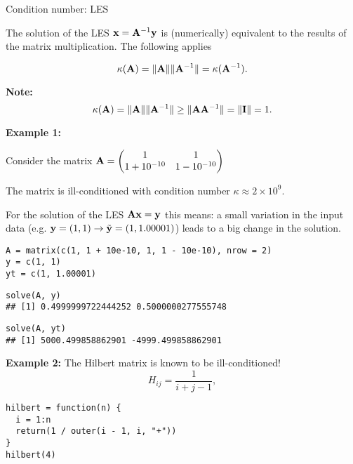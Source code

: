 \documentclass[11pt,compress,t,notes=noshow, xcolor=table]{beamer}
\begin{document}
\begin{vbframe}{Condition number: LES}

The solution of the LES $\mathbf{x} = \mathbf{A}^{-1}\mathbf{y}$ is (numerically) equivalent to the results of the matrix multiplication. The following applies

$$
\kappa(\mathbf{A}) = \|\mathbf{A}\|\|\mathbf{A}^{-1}\| = \kappa(\mathbf{A}^{-1}).
$$

\textbf{Note:}
$$
\kappa(\mathbf{A}) = \|\mathbf{A}\|\|\mathbf{A}^{-1}\| \geq \|\mathbf{A}\mathbf{A}^{-1}\| = \| \mathbf{I} \| = 1.
$$

\lz
\textbf{Example 1:}

Consider the matrix $\mathbf{A} = \begin{pmatrix} 1 & 1 \\1 + 10^{-10} & 1 - 10^{-10} \end{pmatrix}$
\lz

The matrix is ill-conditioned with condition number $\kappa \approx 2 \times 10^9$.

For the solution of the LES $\mathbf{A} \mathbf{x} = \mathbf{y}$ this means: a small variation in the input data (e.g. $\mathbf{y}=(1, 1) \to \tilde {\mathbf{y}} = (1, 1.00001)$) leads to a big change in the solution.
\lz
\lz
\footnotesize
\begin{verbatim}
A = matrix(c(1, 1 + 10e-10, 1, 1 - 10e-10), nrow = 2)
y = c(1, 1)
yt = c(1, 1.00001)
\end{verbatim}

\vspace{0.1cm}

\begin{verbatim}
solve(A, y)
## [1] 0.4999999722444252 0.5000000277555748
\end{verbatim}

\vspace{0.1cm}

\begin{verbatim}
solve(A, yt)
## [1] 5000.499858862901 -4999.499858862901
\end{verbatim}


\normalsize

\framebreak

\textbf{Example 2:} The Hilbert matrix is known to be ill-conditioned!
$$
H_{ij} = \frac{1}{i + j - 1},
$$
\footnotesize
\begin{verbatim}
hilbert = function(n) {
  i = 1:n 
  return(1 / outer(i - 1, i, "+"))
}
hilbert(4)
\end{verbatim}


\end{vbframe}
\end{document}
